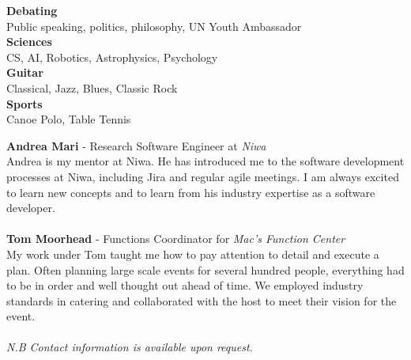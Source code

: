 \documentclass[9pt]{developercv}
\begin{document}


{
	\textbf{Debating} \\
	Public speaking, politics, philosophy, UN Youth Ambassador\\
}
{
	\textbf{Sciences} \\
	CS, AI, Robotics, Astrophysics, Psychology \\
}
{
	\textbf{Guitar} \\
	Classical, Jazz, Blues, Classic Rock \\
}
{
	\textbf{Sports} \\
	Canoe Polo, Table Tennis
}



{
	\textbf{Andrea Mari} - Research Software Engineer at \emph{Niwa} \\
	Andrea is my mentor at Niwa. He has introduced me to the software development processes at Niwa, including Jira and regular agile meetings. I am always excited to learn new concepts and to learn from his industry expertise as a software developer.\\\\
}
{
	\textbf{Tom Moorhead} - Functions Coordinator for \emph{Mac's Function Center} \\
	My work under Tom taught me how to pay attention to detail and execute a plan. Often planning large scale events for several hundred people, everything had to be in order and well thought out ahead of time. We employed industry standards in catering and collaborated with the host to meet their vision for the event. \\\\
}
\emph{N.B Contact information is available upon request.}
\end{document}
